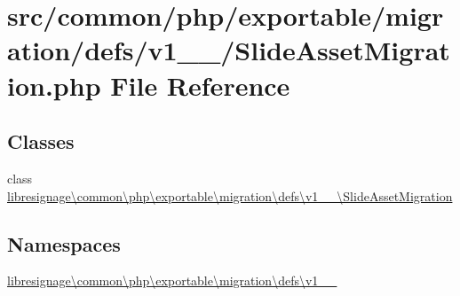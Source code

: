 \hypertarget{v1__1__0_2SlideAssetMigration_8php}{}\section{src/common/php/exportable/migration/defs/v1\+\_\+\_/\+Slide\+Asset\+Migration.php File Reference}
\label{v1__1__0_2SlideAssetMigration_8php}
\subsection*{Classes}
\begin{DoxyCompactItemize}
\item 
class \hyperlink{classlibresignage_1_1common_1_1php_1_1exportable_1_1migration_1_1defs_1_1v1__1__0_1_1SlideAssetMigration}{libresignage\textbackslash{}common\textbackslash{}php\textbackslash{}exportable\textbackslash{}migration\textbackslash{}defs\textbackslash{}v1\+\_\+\_\textbackslash{}\+Slide\+Asset\+Migration}
\end{DoxyCompactItemize}
\subsection*{Namespaces}
\begin{DoxyCompactItemize}
\item 
 \hyperlink{namespacelibresignage_1_1common_1_1php_1_1exportable_1_1migration_1_1defs_1_1v1__1__0}{libresignage\textbackslash{}common\textbackslash{}php\textbackslash{}exportable\textbackslash{}migration\textbackslash{}defs\textbackslash{}v1\+\_\+\_}
\end{DoxyCompactItemize}
